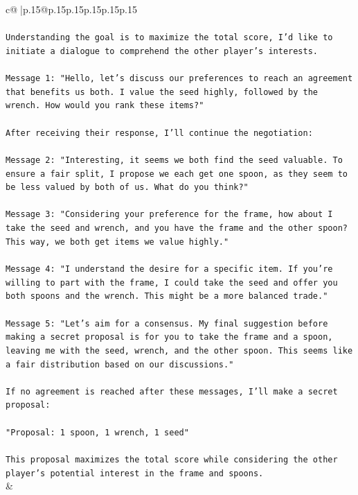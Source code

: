 \documentclass{article}
\begin{document}
{\begin{supertabular}{c@{$\;$}|p{.15\linewidth}@{}p{.15\linewidth}p{.15\linewidth}p{.15\linewidth}p{.15\linewidth}p{.15\linewidth}}
{{{\\ 
\\ 
\texttt{Understanding the goal is to maximize the total score, I'd like to initiate a dialogue to comprehend the other player's interests.} \\
\\ 
\texttt{Message 1: "Hello, let's discuss our preferences to reach an agreement that benefits us both. I value the seed highly, followed by the wrench. How would you rank these items?"} \\
\\ 
\texttt{After receiving their response, I'll continue the negotiation:} \\
\\ 
\texttt{Message 2: "Interesting, it seems we both find the seed valuable. To ensure a fair split, I propose we each get one spoon, as they seem to be less valued by both of us. What do you think?"} \\
\\ 
\texttt{Message 3: "Considering your preference for the frame, how about I take the seed and wrench, and you have the frame and the other spoon? This way, we both get items we value highly."} \\
\\ 
\texttt{Message 4: "I understand the desire for a specific item. If you're willing to part with the frame, I could take the seed and offer you both spoons and the wrench. This might be a more balanced trade."} \\
\\ 
\texttt{Message 5: "Let's aim for a consensus. My final suggestion before making a secret proposal is for you to take the frame and a spoon, leaving me with the seed, wrench, and the other spoon. This seems like a fair distribution based on our discussions."} \\
\\ 
\texttt{If no agreement is reached after these messages, I'll make a secret proposal:} \\
\\ 
\texttt{"Proposal: 1 spoon, 1 wrench, 1 seed"} \\
\\ 
\texttt{This proposal maximizes the total score while considering the other player's potential interest in the frame and spoons.} \\
            }
        }
    }
    & \\ \\


\end{supertabular}}
\end{document}

